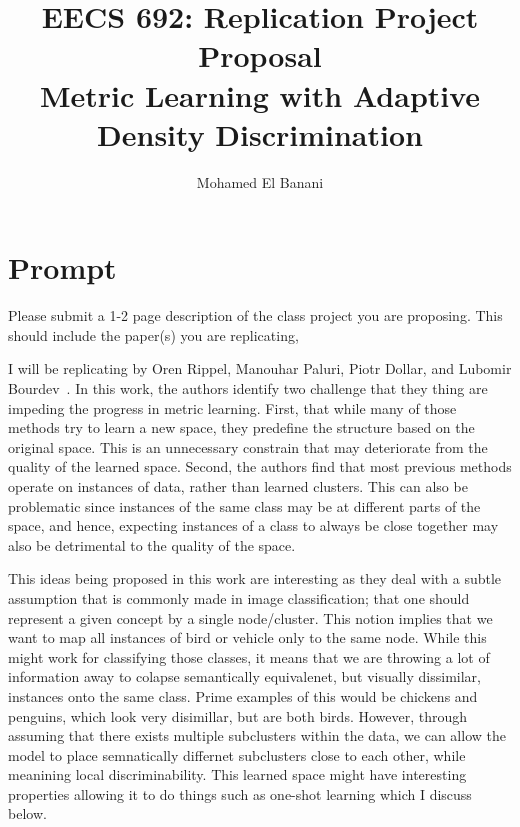 \documentclass{article}
\title{EECS 692: Replication Project Proposal\\
Metric Learning with Adaptive Density Discrimination}
\author{Mohamed El Banani}
\begin{document}
\maketitle

\section{Prompt}
Please submit a 1-2 page description of the class project you are proposing.
This should include the paper(s) you are replicating,

I will be replicating 
by Oren Rippel, Manouhar Paluri, Piotr Dollar, and Lubomir Bourdev~\cite{rippel2016metric}.
In this work, the authors identify two challenge that they thing are impeding the progress in metric learning.
First, that while many of those methods try to learn a new space, they predefine the structure based on the original space.
This is an unnecessary constrain that may deteriorate from the quality of the learned space.
Second, the authors find that most previous methods operate on instances of data, rather than learned clusters.
This can also be problematic since instances of the same class may be at different parts of the space, and hence,
expecting instances of a class to always be close together may also be detrimental to the quality of the space. 

This ideas being proposed in this work are interesting as they deal with a subtle assumption that is commonly made in image classification; 
that one should represent a given concept by a single node/cluster.
This notion implies that we want to map all instances of bird or vehicle only to the same node. While this might work for classifying those classes,
it means that we are throwing a lot of information away to colapse semantically equivalenet, but visually dissimilar, instances onto the same class. 
Prime examples of this would be chickens and penguins, which look very disimillar, but are both birds. 
However, through assuming that there exists multiple subclusters within the data, we can allow the model to place semnatically differnet subclusters close to each other,
while meanining local discriminability. This learned space might have interesting properties allowing it to do things such as one-shot learning which I discuss below.  
\end{document}
